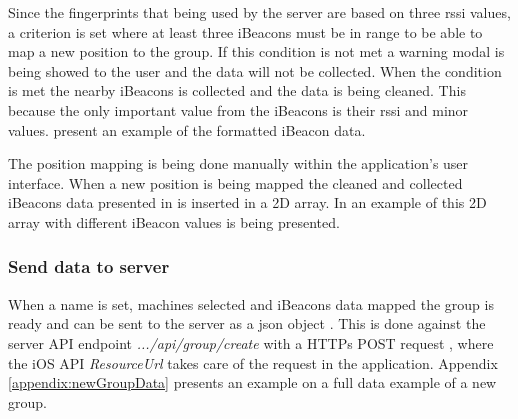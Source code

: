 \bigskip

Since the fingerprints that being used by the server are based on three \acrshort{rssi} values, a criterion is set where at least three iBeacons must be in range to be able to map a new position to the group.
If this condition is not met a warning modal is being showed to the user and the data will not be collected.
When the condition is met the nearby iBeacons is collected and the data is being cleaned.
This because the only important value from the iBeacons is their \acrshort{rssi} and minor values.
 present an example of the formatted iBeacon data.


The position mapping is being done manually within the application's user interface.
When a new position is being mapped the cleaned and collected iBeacons data presented in  is inserted in a 2D array.
In  an example of this 2D array with different iBeacon values is being presented.

\subsubsection{Send data to server}\label{sec:implAppnewGroupSend}
When a name is set, machines selected and iBeacons data mapped the group is ready and can be sent to the server as a \acrfull{json} object \cite{IntroducingJSON}.
This is done against the server API endpoint \textit{.../api/group/create} with a HTTPs POST request \cite{POSTHTTPMDN}, where the iOS API \textit{ResourceUrl} \cite{ResourceURLAppleDeveloper} takes care of the request in the application.
Appendix \ref{appendix:newGroupData} presents an example on a full data example of a new group.
